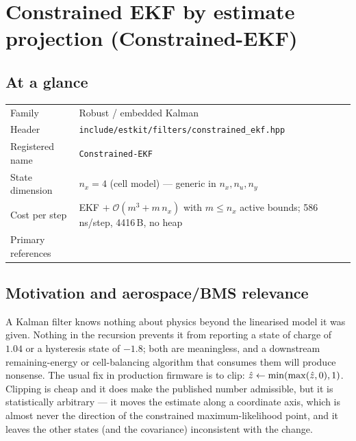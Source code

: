 \providecommand{\vf}{\bm{f}} \providecommand{\vh}{\bm{h}}
\providecommand{\vd}{\bm{d}} \providecommand{\mM}{\bm{M}}
\providecommand{\va}{\bm{a}} \providecommand{\vb}{\bm{b}}

\chapter{Constrained EKF by estimate projection (Constrained-EKF)}
\label{ch:constrainedekf}

\section*{At a glance}
\begin{tabular}{@{}l>{\raggedright\arraybackslash}p{}@{}}
Family & Robust / embedded Kalman \\
Header & \texttt{include/estkit/filters/constrained\_ekf.hpp} \\
Registered name & \texttt{Constrained-EKF} \\
State dimension & $n_x = 4$ (cell model) --- generic in $n_x, n_u, n_y$ \\
Cost per step & EKF $+\;\mathcal{O}(m^3+m\,n_x)$ with $m\le n_x$ active bounds;
  586\,ns/step, 4416\,B, no heap \\
Primary references & \cite{simon2010constraints,simonchia2002,nocedal2006,bucyjoseph1968} \\
\end{tabular}

\section{Motivation and aerospace/BMS relevance}
A Kalman filter knows nothing about physics beyond the linearised model it was given.  Nothing in
the recursion prevents it from reporting a state of charge of $1.04$ or a hysteresis state of
$-1.8$; both are meaningless, and a downstream remaining-energy or cell-balancing algorithm that
consumes them will produce nonsense.  The usual fix in production firmware is to clip:
$\hat{z}\leftarrow\min(\max(\hat{z},0),1)$.  Clipping is cheap and it does make the
published number admissible, but it is statistically arbitrary --- it moves the estimate along a
coordinate axis, which is almost never the direction of the constrained maximum-likelihood point,
and it leaves the other states (and the covariance) inconsistent with the change.

